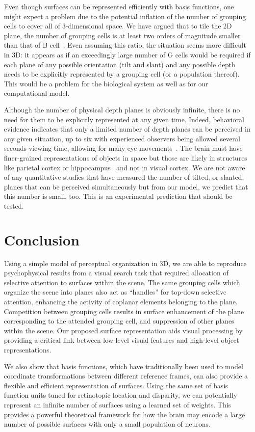 Even though surfaces can be represented efficiently with basis functions, one might expect a problem due to the potential inflation of the number of grouping cells to cover all of 3-dimensional space. We have argued that to tile the 2D plane, the number of grouping cells is at least two orders of magnitude smaller than that of B cell~\citep{Craft_etal07}. Even assuming this ratio, the situation seems more difficult in 3D: it appears as if an exceedingly large number of G cells would be required if each plane of any possible orientation (tilt and slant) and any possible depth needs to be explicitly represented by a grouping cell (or a population thereof). This would be a problem for the biological system as well as for our computational model.

Although the number of physical depth planes is obviously infinite, there is no need for them to be explicitly represented at any given time. Indeed, behavioral evidence indicates that only a limited number of depth planes can be perceived in any given situation, up to six with experienced observers being allowed several seconds viewing time, allowing for many eye movements~\citep{Tsirlin_etal08}. The brain must have finer-grained representations of objects in space but those are likely in structures like parietal cortex or hippocampus~\citep{Manns_Eichenbaum09,Deshmukh_Knierim13} and not in visual cortex. We are not aware of any quantitative studies that have measured the number of tilted, or slanted, planes that can be perceived simultaneously but from our model, we predict that this number is small, too. This is an experimental prediction that should be tested.

\section{Conclusion}

Using a simple model of perceptual organization in 3D,  we are able to reproduce psychophysical results from a visual search task that required allocation of selective attention to surfaces within the scene. The same grouping cells which organize the scene into planes also act as ``handles'' for top-down selective attention, enhancing the activity of coplanar elements belonging to the plane. Competition between grouping cells results in surface enhancement of the plane corresponding to the attended grouping cell, and suppression of other planes within the scene. Our proposed surface representation aids visual processing by providing a critical link between low-level visual features and high-level object representations.

We also show that basis functions, which have traditionally been used to model coordinate transformations between different reference frames, can also provide a flexible and efficient representation of surfaces. Using the same set of basis function units tuned for retinotopic location and disparity, we can potentially represent an infinite number of surfaces using a learned set of weights. This provides a powerful theoretical framework for how the brain may encode a large number of possible surfaces with only a small population of neurons.